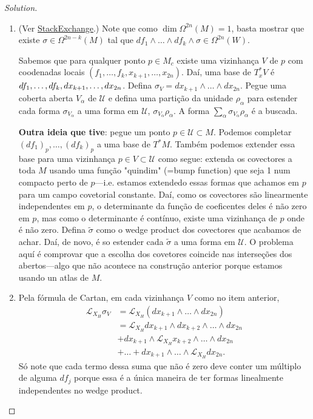 \begin{proof}[Solution]\leavevmode
	\begin{enumerate}[label=\alph*.]
		\item (Ver \href{https://math.stackexchange.com/questions/2857126/df-1-df-k-linearly-independent-rightarrow-frac-omegann-df-1-wedge}{StackExchange}.) Note que como $\dim \Omega^{2n}(M) =1$, basta mostrar que existe $ \sigma\in\Omega^{2n-k}(M)$ tal que $df_1\wedge \ldots \wedge df_k\wedge \sigma\in\Omega^{2n}(W)$.

		Sabemos que para qualquer ponto $p\in M_c$ existe uma vizinhança $V$ de $p$ com coodenadas locais $(f_1,\ldots,f_k,x_{k+1},\ldots,x_{2n})$. Daí, uma base de $T_x^*V$ é $df_1,\ldots,df_k,\\dx_{k+1},\ldots,dx_{2n}$. Defina $\sigma_V=dx_{k+1}\wedge \ldots \wedge dx_{2n}$. Pegue uma coberta aberta $V_\alpha$ de $\mathcal{U}$ e defina uma partição da unidade $\rho_\alpha$ para estender cada forma $\sigma_{V_\alpha}$ a uma forma em $\mathcal{U}$, $\sigma_{V_\alpha}\rho_\alpha$. A forma $\sum_{\alpha}\sigma_{V_\alpha}\rho_\alpha$ é a buscada.


		\textbf{Outra ideia que tive}: pegue um ponto $p\in\mathcal{U}\subset M$. Podemos completar $(df_1)_p,\ldots,(df_k)_p$ a uma base de $T^*M$. Tamb\'em podemos extender essa base para uma vizinhança $p\in V\subset \mathcal{U}$ como segue: extenda os covectores a toda $M$ usando uma fun\c c\~ao "quindim" (=bump function) que seja 1 num compacto perto de $p$---i.e. estamos extendedo essas formas que achamos em $p$ para um campo covetorial constante. Da\'i, como os covectores s\~ao linearmente independentes em $p$, o determinante da fun\c c\~ao de coeficentes deles \'e n\~ao zero em $p$, mas como o determinante \'e cont\'inuo, existe uma vizinhança de $p$ onde \'e n\~ao zero. Defina $\tilde{\sigma}$ como o wedge product dos covectores que acabamos de achar. Daí, de novo, é so estender cada $\tilde{\sigma}$ a uma forma em $\mathcal{U}$. O problema aquí é comprovar que a escolha dos covetores coincide nas interseções dos abertos---algo que não acontece na construção anterior porque estamos usando un atlas de $M$.

		\item Pela f\'ormula de Cartan, em cada vizinhança $V$ como no item anterior,
\begin{align*}
	\mathcal{L}_{X_H}\sigma_V&=\mathcal{L}_{X_H}(dx_{k+1}\wedge \ldots \wedge dx_{2n})\\
	&=\mathcal{L}_{X_H}dx_{k+1}\wedge dx_{k+2}\wedge  \ldots \wedge dx_{2n}\\
	&+dx_{k+1}\wedge \mathcal{L}_{X_H}x_{k+2}\wedge \ldots \wedge dx_{2n}\\
	&+\ldots +dx_{k+1}\wedge \ldots \wedge \mathcal{L}_{X_H}dx_{2n}.
\end{align*}
Só note que cada termo dessa suma que não é zero deve conter um múltiplo de alguma $df_j$ porque essa é a única maneira de ter formas linealmente independentes no wedge product.


\end{enumerate}
\end{proof}
